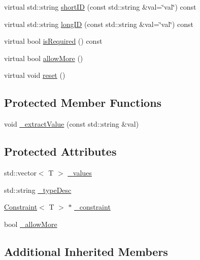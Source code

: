 \begin{DoxyCompactItemize}
\item 
virtual std\+::string \hyperlink{class_t_c_l_a_p_1_1_multi_arg_ac2c962112704b899f4c8b8565f2c4bb3}{short\+I\+D} (const std\+::string \&val=\char`\"{}val\char`\"{}) const 
\item 
virtual std\+::string \hyperlink{class_t_c_l_a_p_1_1_multi_arg_a16c00fbce6876bceabb3dab4723f7e79}{long\+I\+D} (const std\+::string \&val=\char`\"{}val\char`\"{}) const 
\item 
virtual bool \hyperlink{class_t_c_l_a_p_1_1_multi_arg_a3cb7fec92f3d70e0e455c6bc33fbebab}{is\+Required} () const 
\item 
virtual bool \hyperlink{class_t_c_l_a_p_1_1_multi_arg_ab05097627c81cd65975fa1b99fae9bd0}{allow\+More} ()
\item 
virtual void \hyperlink{class_t_c_l_a_p_1_1_multi_arg_ab21f01f22978a1c0eea716399e9ff89b}{reset} ()
\end{DoxyCompactItemize}
\subsection*{Protected Member Functions}
\begin{DoxyCompactItemize}
\item 
void \hyperlink{class_t_c_l_a_p_1_1_multi_arg_a26cbf5e86ac66d876f9285f1fda22470}{\+\_\+extract\+Value} (const std\+::string \&val)
\end{DoxyCompactItemize}
\subsection*{Protected Attributes}
\begin{DoxyCompactItemize}
\item 
std\+::vector$<$ T $>$ \hyperlink{class_t_c_l_a_p_1_1_multi_arg_aabcab153e09608343713a6ffef431783}{\+\_\+values}
\item 
std\+::string \hyperlink{class_t_c_l_a_p_1_1_multi_arg_a0f6a2b04fe15d1ede95165fc6e1949e8}{\+\_\+type\+Desc}
\item 
\hyperlink{class_t_c_l_a_p_1_1_constraint}{Constraint}$<$ T $>$ $\ast$ \hyperlink{class_t_c_l_a_p_1_1_multi_arg_afc754048b66bc3a251268947273ea906}{\+\_\+constraint}
\item 
bool \hyperlink{class_t_c_l_a_p_1_1_multi_arg_a93a3ef586f763d46839c0e737689b85f}{\+\_\+allow\+More}
\end{DoxyCompactItemize}
\subsection*{Additional Inherited Members}


